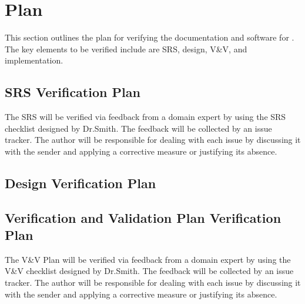 \documentclass[12pt, titlepage]{article}
\begin{document}

\citet{SRS}



\section{Plan}

This section outlines the plan for verifying the documentation and software for \progname. 
The key elements to be verified include are SRS, design, V\&V, and implementation.

\subsection{SRS Verification Plan}

The SRS will be verified via feedback from a domain expert by using the SRS checklist designed by Dr.Smith. The feedback will be collected by an issue tracker.
The author will be responsible for dealing with each issue by discussing it with the sender and applying a corrective measure or justifying its absence.

\subsection{Design Verification Plan}




\subsection{Verification and Validation Plan Verification Plan}

The V\&V Plan will be verified via feedback from a domain expert by using the V\&V checklist designed by Dr.Smith. The feedback will be collected by an issue tracker.
The author will be responsible for dealing with each issue by discussing it with the sender and applying a corrective measure or justifying its absence.
\end{document}

